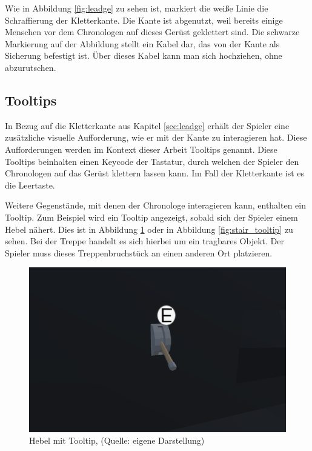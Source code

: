 Wie in Abbildung \ref{fig:leadge} zu sehen ist, markiert die weiße Linie die Schraffierung der Kletterkante. Die Kante ist abgenutzt, weil bereits einige Menschen vor dem Chronologen auf dieses Gerüst geklettert sind. 
Die schwarze Markierung auf der Abbildung stellt ein Kabel dar, das von der Kante als Sicherung befestigt ist. Über dieses Kabel kann man sich hochziehen, ohne abzurutschen.

\subsection{Tooltips}\label{sec:tooltip}

In Bezug auf die Kletterkante aus Kapitel \ref{sec:leadge} erhält der Spieler eine zusätzliche visuelle Aufforderung, wie er mit der Kante zu interagieren hat. Diese Aufforderungen werden im Kontext dieser Arbeit Tooltips genannt. Diese Tooltips beinhalten einen Keycode der Tastatur, durch welchen der Spieler den Chronologen auf das Gerüst klettern lassen kann. Im Fall der Kletterkante ist es die Leertaste.

Weitere Gegenstände, mit denen der Chronologe interagieren kann, enthalten ein Tooltip. Zum Beispiel wird ein Tooltip angezeigt, sobald sich der Spieler einem Hebel nähert. Dies ist in Abbildung \ref{fig:lever_tooltip} oder in Abbildung \ref{fig:stair_tooltip} zu sehen. Bei der Treppe handelt es sich hierbei um ein tragbares Objekt. Der Spieler muss dieses Treppenbruchstück an einen anderen Ort platzieren.

\begin{figure}[ht]
\centering
\includegraphics[width=0.8\linewidth]{content/pictures/lever_tooltip.jpg}
\caption{Hebel mit Tooltip, (Quelle: eigene Darstellung)}
\label{fig:lever_tooltip}
\end{figure}

